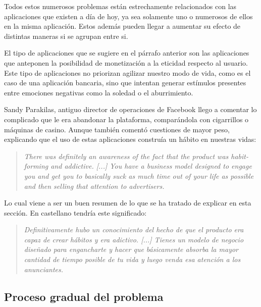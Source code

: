 Todos estos numerosos problemas están estrechamente relacionados con las aplicaciones que existen a día de hoy, ya sea solamente uno o numerosos de ellos en la misma aplicación. Estos además pueden llegar a aumentar su efecto de distintas maneras si se agrupan entre si.

\vspace{0.3cm}

El tipo de aplicaciones que se sugiere en el párrafo anterior son las aplicaciones que anteponen la posibilidad de monetización a la eticidad respecto al usuario. Este tipo de aplicaciones no priorizan agilizar nuestro modo de vida, como es el caso de una aplicación bancaria, sino que intentan generar estímulos presentes entre emociones negativas como la soledad o el aburrimiento.

\vspace{0.3cm}

Sandy Parakilas, antiguo director de operaciones de Facebook llego a comentar lo complicado que le era abandonar la plataforma, comparándola con cigarrillos o máquinas de casino. Aunque también comentó cuestiones de mayor peso, explicando que el uso de estas aplicaciones construía un hábito en nuestras vidas: \cite{Social-Deliberately}

\begin{quotation}
		\textit{There was definitely an awareness of the fact that the product was habit-forming and addictive. [...] You have a business model designed to engage you and get you to basically suck as much time out of your life as possible and then selling that attention to advertisers.}
\end{quotation}

Lo cual viene a ser un buen resumen de lo que se ha tratado de explicar en esta sección. En castellano tendría este significado:

\begin{quotation}
		\textit{Definitivamente hubo un conocimiento del hecho de que el producto era capaz de crear hábitos y era adictivo. [...] Tienes un modelo de negocio diseñado para engancharte y hacer que básicamente absorba la mayor cantidad de tiempo posible de tu vida y luego venda esa atención a los anunciantes.}
\end{quotation}

\subsection{Proceso gradual del problema}\label{sec:prosc_problm}

